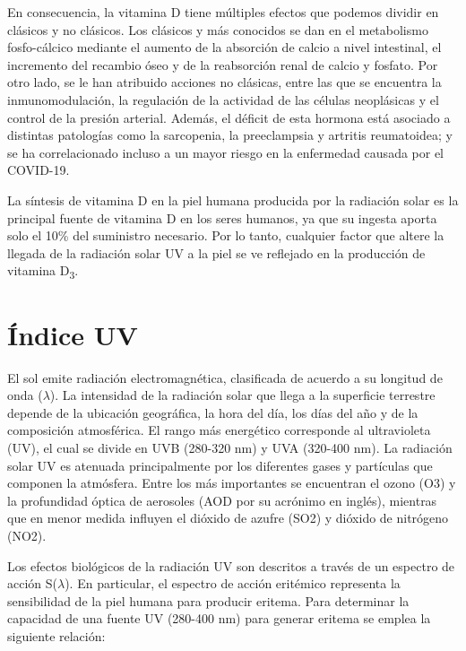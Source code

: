 En consecuencia, la vitamina D tiene múltiples efectos que podemos dividir en clásicos y no clásicos\cite{bikle_2014}. Los clásicos y más conocidos se dan en el metabolismo fosfo-cálcico mediante el aumento de la absorción de calcio a nivel intestinal, el incremento del recambio óseo y de la reabsorción renal de calcio y fosfato\cite{zuluga_2011}. Por otro lado, se le han atribuido acciones no clásicas, entre las que se encuentra la inmunomodulación, la regulación de la actividad de las células neoplásicas y el control de la presión arterial\cite{atlas_radiacion_colombia_2005}. Además, el déficit de esta hormona está asociado a distintas patologías como la sarcopenia\cite{atlas_radiacion_colombia_2005}, la preeclampsia\cite{belizan_1991} y artritis reumatoidea\cite{Ishikawa_2016}; y se ha correlacionado incluso a un mayor riesgo en la enfermedad causada por el COVID-19\cite{Mercola2020}.

La síntesis de vitamina D en la piel humana producida por la radiación solar es la principal fuente de vitamina D en los seres humanos, ya que su ingesta aporta solo el 10\% del suministro necesario\cite{adam_2002}. Por lo tanto, cualquier factor que altere la llegada de la radiación solar UV a la piel se ve reflejado en la producción de vitamina D\textsubscript{3}\cite{Holick_2004}.

\section*{Índice UV}

El sol emite radiación electromagnética, clasificada de acuerdo a su longitud de onda ($\lambda$). La intensidad de la radiación solar que llega a la superficie terrestre depende de la ubicación geográfica, la hora del día, los días del año y de la composición atmosférica. El rango más energético corresponde al ultravioleta (UV), el cual se divide en UVB (280-320 nm) y UVA (320-400 nm). La radiación solar UV es atenuada principalmente por los diferentes gases y partículas que componen la atmósfera\cite{Hrabk_2018}. Entre los más importantes se encuentran el ozono (O3) y la profundidad óptica de aerosoles (AOD por su acrónimo en inglés)\cite{Kazadzis_2009}, mientras que en menor medida influyen el dióxido de azufre (SO2) y dióxido de nitrógeno (NO2)\cite{Bais_1993}.

Los efectos biológicos de la radiación UV son descritos a través de un espectro de acción S($\lambda$). En particular, el espectro de acción eritémico representa la sensibilidad de la piel humana para producir eritema. Para determinar la capacidad de una fuente UV (280-400 nm) para generar eritema se emplea la siguiente relación:


